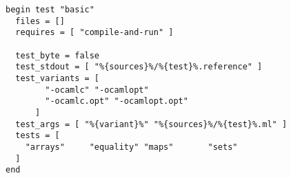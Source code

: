 \begin{verbatim}
begin test "basic"
  files = []
  requires = [ "compile-and-run" ]

  test_byte = false
  test_stdout = [ "%{sources}%/%{test}%.reference" ]
  test_variants = [
        "-ocamlc" "-ocamlopt"
        "-ocamlc.opt" "-ocamlopt.opt"
      ]
  test_args = [ "%{variant}%" "%{sources}%/%{test}%.ml" ]
  tests = [
    "arrays"     "equality"	"maps"       "sets"
  ]
end
\end{verbatim}
